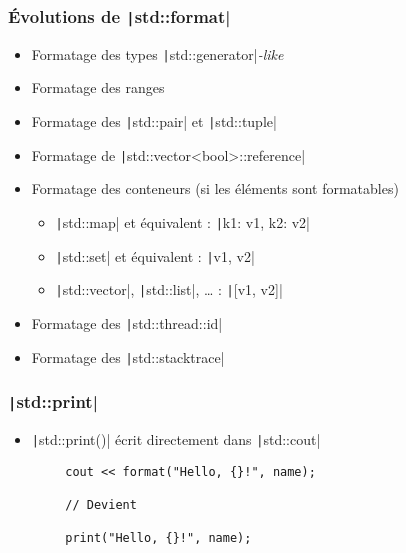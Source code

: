 \documentclass[C++.tex]{subfiles}
\begin{document}
\begin{frame}[fragile]
	\frametitle{Évolutions de \texttt|std::format|}
	\begin{itemize}
		\item Formatage des types \texttt|std::generator|\textit{-like}
		\item Formatage des ranges
		\item Formatage des \texttt|std::pair| et \texttt|std::tuple|
		\item Formatage de \texttt|std::vector<bool>::reference|
		\item Formatage des conteneurs (si les éléments sont formatables)
		\begin{itemize}
			\item \texttt|std::map| et équivalent : \texttt|{k1: v1, k2: v2}|
			\item \texttt|std::set| et équivalent : \texttt|{v1, v2}|
			\item \texttt|std::vector|, \texttt|std::list|, \ldots{} : \texttt|[v1, v2]|
		\end{itemize}
		\item Formatage des \texttt|std::thread::id|
		\item Formatage des \texttt|std::stacktrace|
	\end{itemize}
\end{frame}

\begin{frame}[fragile]
	\frametitle{\texttt|std::print|}
	\begin{itemize}
		\item \texttt|std::print()| écrit directement dans \texttt|std::cout|
	\end{itemize}

	\begin{verbatim}
		cout << format("Hello, {}!", name);

		// Devient

		print("Hello, {}!", name);
	\end{verbatim}
\end{frame}
\end{document}

